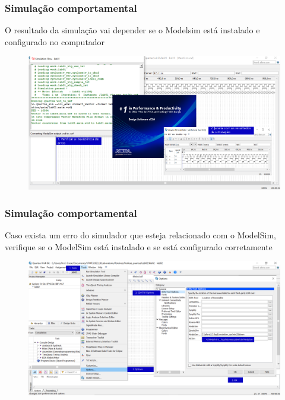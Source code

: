 \documentclass{CPSPresentation}
\begin{document}
\begin{frame}
	\frametitle{Simulação comportamental}
	
	
	\begin{block}{}
		\justifying
		O resultado da simulação vai depender se o Modelsim está instalado e configurado no computador
	\end{block}
	
	
	\begin{figure}[h]
		\centering
		\includegraphics[width=1.02\textwidth]{quartus/fig21.pdf}
	\end{figure}
	
	
\end{frame}
\begin{frame}
	\frametitle{Simulação comportamental}
	
	
	\begin{block}{}
		\justifying
		Caso exista um erro do simulador que esteja relacionado com o ModelSim, verifique se o ModelSim está instalado e se está configurado corretamente
	\end{block}
	
	
	\begin{figure}[h]
		\centering
		\includegraphics[width=1.02\textwidth]{quartus/fig27.pdf}
	\end{figure}
	
	
\end{frame}
\end{document}
